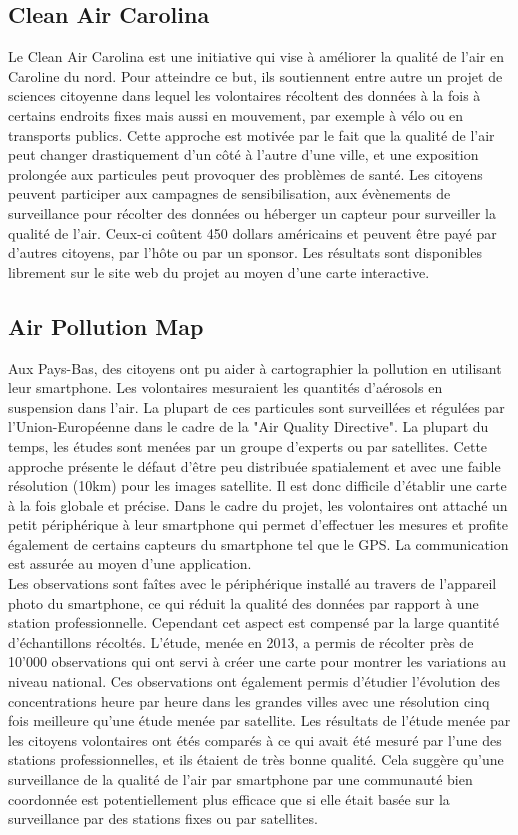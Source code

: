 \documentclass[10pt, article]{llncs}
\begin{document}
	\subsection{Clean Air Carolina}
		Le Clean Air Carolina est une initiative qui vise à améliorer la qualité de l'air en Caroline du nord. Pour atteindre ce but, ils soutiennent entre autre un projet de sciences citoyenne dans lequel les volontaires récoltent des données à la fois à certains endroits fixes mais aussi en mouvement, par exemple à vélo ou en transports publics. Cette approche est motivée par le fait que la qualité de l'air peut changer drastiquement d'un côté à l'autre d'une ville, et une exposition prolongée aux particules peut provoquer des problèmes de santé. Les citoyens peuvent participer aux campagnes de sensibilisation, aux évènements de surveillance pour récolter des données ou héberger un capteur pour surveiller la qualité de l'air. Ceux-ci coûtent 450 dollars américains et peuvent être payé par d'autres citoyens, par l'hôte ou par un sponsor. Les résultats sont disponibles librement sur le site web du projet au moyen d'une carte interactive.
		
	\subsection{Air Pollution Map}
		Aux Pays-Bas, des citoyens ont pu aider à cartographier la pollution en utilisant leur smartphone. Les volontaires mesuraient les quantités d'aérosols en suspension dans l'air. La plupart de ces particules sont surveillées et régulées par l'Union-Européenne dans le cadre de la "Air Quality Directive". La plupart du temps, les études sont menées par un groupe d'experts ou par satellites. Cette approche présente le défaut d'être peu distribuée spatialement et avec une faible résolution (10km) pour les images satellite. Il est donc difficile d'établir une carte à la fois globale et précise. Dans le cadre du projet, les volontaires ont attaché un petit périphérique à leur smartphone qui permet d'effectuer les mesures et profite également de certains capteurs du smartphone tel que le GPS. La communication est assurée au moyen d'une application.\\
		Les observations sont faîtes avec le périphérique installé au travers de l'appareil photo du smartphone, ce qui réduit la qualité des données par rapport à une station professionnelle. Cependant cet aspect est compensé par la large quantité d'échantillons récoltés. L'étude, menée en 2013, a permis de récolter près de 10'000 observations qui ont servi à créer une carte pour montrer les variations au niveau national. Ces observations ont également permis d'étudier l'évolution des concentrations heure par heure dans les grandes villes avec une résolution cinq fois meilleure qu'une étude menée par satellite. Les résultats de l'étude menée par les citoyens volontaires ont étés comparés à ce qui avait été mesuré par l'une des stations professionnelles, et ils étaient de très bonne qualité. Cela suggère qu'une surveillance de la qualité de l'air par smartphone par une communauté bien coordonnée est potentiellement plus efficace que si elle était basée sur la surveillance par des stations fixes ou par satellites.
		
\end{document}
